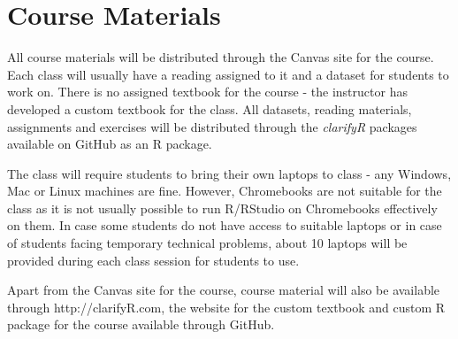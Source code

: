 \documentclass[10pt, letterpaper, twoside]{memoir}\usepackage{knitr}
\begin{document}
\section{Course Materials}

All course materials will be distributed through the Canvas site for the course. Each class will usually have a reading assigned to it and a dataset for students to work on. There is no assigned textbook for the course - the instructor has developed a custom textbook for the class. All datasets, reading materials, assignments and exercises will be distributed through the \emph{clarifyR} packages available on GitHub as an R package.

The class will require students to bring their own laptops to class - any Windows, Mac or Linux machines are fine. However, Chromebooks are not suitable for the class as it is not usually possible to run R/RStudio on Chromebooks effectively on them. In case some students do not have access to suitable laptops or in case of students facing temporary technical problems, about 10 laptops will be provided during each class session for students to use.

Apart from the Canvas site for the course, course material will also be available through http://clarifyR.com, the website for the custom textbook and custom R package for the course available through GitHub.
\end{document}
